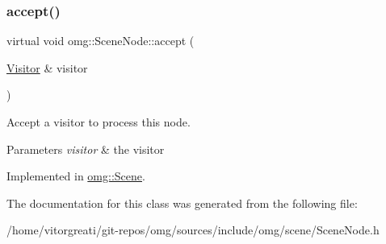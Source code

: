 \subsubsection{\texorpdfstring{accept()}{accept()}}
{\footnotesize\ttfamily virtual void omg\+::\+Scene\+Node\+::accept (\begin{DoxyParamCaption}\item[{\mbox{\hyperlink{classomg_1_1_visitor}{Visitor}} \&}]{visitor }\end{DoxyParamCaption})\hspace{0.3cm}{\ttfamily [pure virtual]}}



Accept a visitor to process this node. 


\begin{DoxyParams}{Parameters}
{\em visitor} & the visitor \\
\hline
\end{DoxyParams}


Implemented in \mbox{\hyperlink{classomg_1_1_scene_a460b3582d6dc72fcaeff4c08d44335d9}{omg\+::\+Scene}}.



The documentation for this class was generated from the following file\+:\begin{DoxyCompactItemize}
\item 
/home/vitorgreati/git-\/repos/omg/sources/include/omg/scene/Scene\+Node.\+h\end{DoxyCompactItemize}
